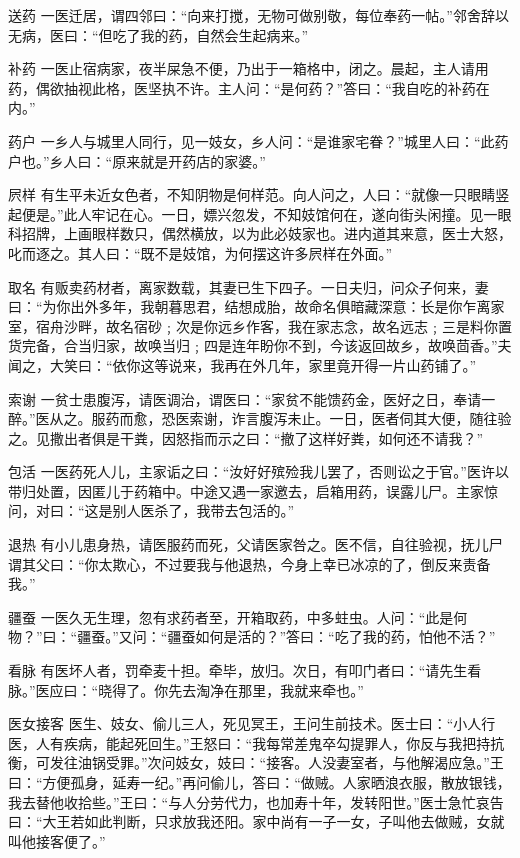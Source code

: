 \documentclass[12pt,UTF8]{ctexbook}
\begin{document}
送药
一医迁居，谓四邻曰：“向来打搅，无物可做别敬，每位奉药一帖。”邻舍辞以无病，医曰：“但吃了我的药，自然会生起病来。”

补药
一医止宿病家，夜半屎急不便，乃出于一箱格中，闭之。晨起，主人请用药，偶欲抽视此格，医坚执不许。主人问：“是何药？”答曰：“我自吃的补药在内。”

药户
一乡人与城里人同行，见一妓女，乡人问：“是谁家宅眷？”城里人曰：“此药户也。”乡人曰：“原来就是开药店的家婆。”

屄样
有生平未近女色者，不知阴物是何样范。向人问之，人曰：“就像一只眼睛竖起便是。”此人牢记在心。一日，嫖兴忽发，不知妓馆何在，遂向街头闲撞。见一眼科招牌，上画眼样数只，偶然横放，以为此必妓家也。进内道其来意，医士大怒，叱而逐之。其人曰：“既不是妓馆，为何摆这许多屄样在外面。”

取名
有贩卖药材者，离家数载，其妻已生下四子。一日夫归，问众子何来，妻曰：“为你出外多年，我朝暮思君，结想成胎，故命名俱暗藏深意：长是你乍离家室，宿舟沙畔，故名宿砂﹔次是你远乡作客，我在家志念，故名远志﹔三是料你置货完备，合当归家，故唤当归﹔四是连年盼你不到，今该返回故乡，故唤茴香。”夫闻之，大笑曰：“依你这等说来，我再在外几年，家里竟开得一片山药铺了。”

索谢
一贫士患腹泻，请医调治，谓医曰：“家贫不能馈药金，医好之日，奉请一醉。”医从之。服药而愈，恐医索谢，诈言腹泻未止。一日，医者伺其大便，随往验之。见撒出者俱是干粪，因怒指而示之曰：“撤了这样好粪，如何还不请我？”

包活
一医药死人儿，主家诟之曰：“汝好好殡殓我儿罢了，否则讼之于官。”医许以带归处置，因匿儿于药箱中。中途又遇一家邀去，启箱用药，误露儿尸。主家惊问，对曰：“这是别人医杀了，我带去包活的。”

退热
有小儿患身热，请医服药而死，父请医家咎之。医不信，自往验视，抚儿尸谓其父曰：“你太欺心，不过要我与他退热，今身上幸已冰凉的了，倒反来责备我。”

疆蚕
一医久无生理，忽有求药者至，开箱取药，中多蛀虫。人问：“此是何物？”曰：“疆蚕。”又问：“疆蚕如何是活的？”答曰：“吃了我的药，怕他不活？”

看脉
有医坏人者，罚牵麦十担。牵毕，放归。次日，有叩门者曰：“请先生看脉。”医应曰：“晓得了。你先去淘净在那里，我就来牵也。”

医女接客
医生、妓女、偷儿三人，死见冥王，王问生前技术。医士曰：“小人行医，人有疾病，能起死回生。”王怒曰：“我每常差鬼卒勾提罪人，你反与我把持抗衡，可发往油锅受罪。”次问妓女，妓曰：“接客。人没妻室者，与他解渴应急。”王曰：“方便孤身，延寿一纪。”再问偷儿，答曰：“做贼。人家晒浪衣服，散放银钱，我去替他收拾些。”王曰：“与人分劳代力，也加寿十年，发转阳世。”医士急忙哀告曰：“大王若如此判断，只求放我还阳。家中尚有一子一女，子叫他去做贼，女就叫他接客便了。”
\end{document}
